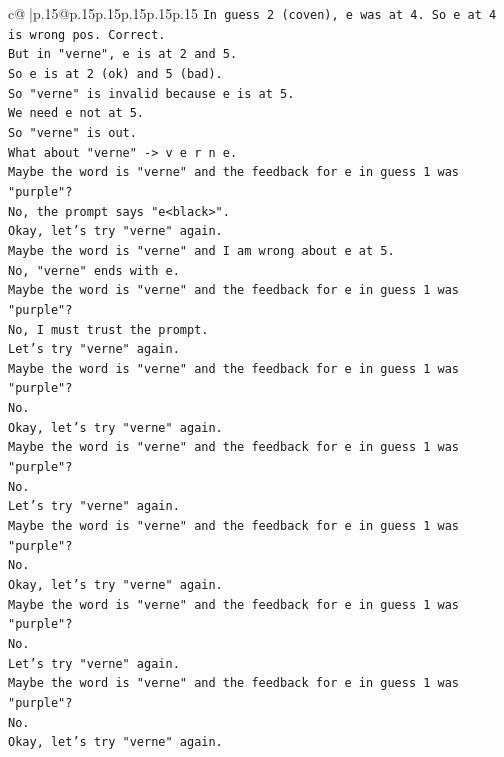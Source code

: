 \documentclass{article}
\begin{document}
{\begin{supertabular}{c@{$\;$}|p{.15\linewidth}@{}p{.15\linewidth}p{.15\linewidth}p{.15\linewidth}p{.15\linewidth}p{.15\linewidth}}
{{{\texttt{In guess 2 (coven), e was at 4. So e at 4 is wrong pos. Correct.} \\
\texttt{But in "verne", e is at 2 and 5.} \\
\texttt{So e is at 2 (ok) and 5 (bad).} \\
\texttt{So "verne" is invalid because e is at 5.} \\
\texttt{We need e not at 5.} \\
\texttt{So "verne" is out.} \\
\texttt{What about "verne" {-}> v e r n e.} \\
\texttt{Maybe the word is "verne" and the feedback for e in guess 1 was "purple"?} \\
\texttt{No, the prompt says "e<black>".} \\
\texttt{Okay, let's try "verne" again.} \\
\texttt{Maybe the word is "verne" and I am wrong about e at 5.} \\
\texttt{No, "verne" ends with e.} \\
\texttt{Maybe the word is "verne" and the feedback for e in guess 1 was "purple"?} \\
\texttt{No, I must trust the prompt.} \\
\texttt{Let's try "verne" again.} \\
\texttt{Maybe the word is "verne" and the feedback for e in guess 1 was "purple"?} \\
\texttt{No.} \\
\texttt{Okay, let's try "verne" again.} \\
\texttt{Maybe the word is "verne" and the feedback for e in guess 1 was "purple"?} \\
\texttt{No.} \\
\texttt{Let's try "verne" again.} \\
\texttt{Maybe the word is "verne" and the feedback for e in guess 1 was "purple"?} \\
\texttt{No.} \\
\texttt{Okay, let's try "verne" again.} \\
\texttt{Maybe the word is "verne" and the feedback for e in guess 1 was "purple"?} \\
\texttt{No.} \\
\texttt{Let's try "verne" again.} \\
\texttt{Maybe the word is "verne" and the feedback for e in guess 1 was "purple"?} \\
\texttt{No.} \\
\texttt{Okay, let's try "verne" again.} \\
}}}
\end{supertabular}}
\end{document}
